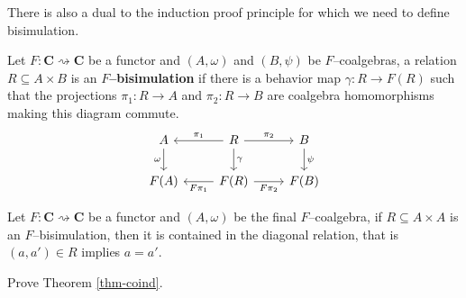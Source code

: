 \documentclass[main.tex]{subfiles}
\begin{document}
There is also a dual to the induction proof principle for which we need to define bisimulation.
\begin{defn}[$F$--bisimulation]
	Let $F:\mathbf{C}\rightsquigarrow \mathbf{C}$ be a functor and $(A,\omega)$ and $(B, \psi)$ be $F$--coalgebras, a relation $R \subseteq A \times B$ is an $F$\textbf{--bisimulation} if there is a behavior map $\gamma:R \rightarrow F(R)$ such that the projections $\pi_1:R\rightarrow A$ and $\pi_2:R \rightarrow B$ are coalgebra homomorphisms making this diagram commute.
	\begin{equation}\label{diag-mergedef}
		\centering
		\begin{tikzcd}
			A \arrow[d, "\omega"'] & R \arrow[d, "\gamma"] \arrow[l, "\pi_1"'] \arrow[r, "\pi_2"] & B \arrow[d, "\psi"] \\
			F(A)                         & F(R) \arrow[r, "F\pi_2"'] \arrow[l, "F\pi_1"]                          & F(B)                      
		\end{tikzcd}
	\end{equation}
\end{defn}

\begin{thm}\label{thm-coind} Let $F:\mathbf{C}\rightsquigarrow \mathbf{C}$ be a functor and $(A, \omega)$ be the final $F$--coalgebra, if $R\subseteq A\times A$ is an $F$--bisimulation, then it is contained in the diagonal relation, that is $(a,a') \in R$ implies $a = a'$.
\end{thm}
\begin{exer}[0.5pts]
    Prove Theorem \ref{thm-coind}.
\end{exer}
\end{document}
